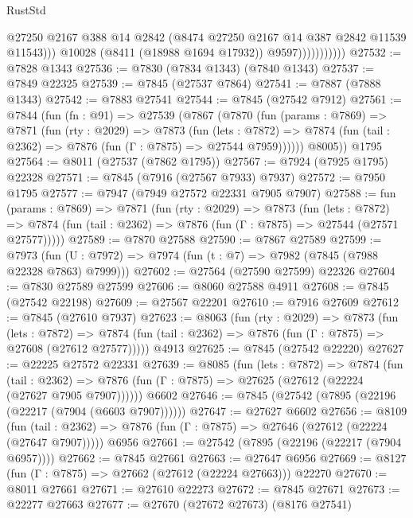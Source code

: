 \begin{lexlean}{RustStd}
\begin{coremodule}
                              @27250
                              @2167
                              @388
                              @14
                              @2842
                              (@8474 @27250 @2167 @14 @387 @2842 @11539 @11543)))
                          @10028
                          (@8411 (@18988 @1694 @17932))
                          @9597)))))))))))
@27532 := @7828 @1343
@27536 := @7830 (@7834 @1343) (@7840 @1343)
@27537 := @7849 @22325
@27539 := @7845 (@27537 @7864)
@27541 := @7887 (@7888 @1343)
@27542 := @7883 @27541
@27544 := @7845 (@27542 @7912)
@27561 := @7844
    (fun (fn : @91) =>
    @27539
      (@7867
        (@7870
          (fun (params : @7869) =>
          @7871
            (fun (rty : @2029) =>
            @7873
              (fun (lets : @7872) =>
              @7874 (fun (tail : @2362) => @7876 (fun (Γ : @7875) => @27544 @7959))))))
        @8005))
    @1795
@27564 := @8011 (@27537 (@7862 @1795))
@27567 := @7924 (@7925 @1795) @22328
@27571 := @7845 (@7916 (@27567 @7933) @7937)
@27572 := @7950 @1795
@27577 := @7947 (@7949 @27572 @22331 @7905 @7907)
@27588 := fun (params : @7869) =>
  @7871
    (fun (rty : @2029) =>
    @7873
      (fun (lets : @7872) =>
      @7874 (fun (tail : @2362) => @7876 (fun (Γ : @7875) => @27544 (@27571 @27577)))))
@27589 := @7870 @27588
@27590 := @7867 @27589
@27599 := @7973
    (fun (U : @7972) => @7974 (fun (t : @7) => @7982 (@7845 (@7988 @22328 @7863) @7999)))
@27602 := @27564 (@27590 @27599) @22326
@27604 := @7830 @27589 @27599
@27606 := @8060 @27588 @4911
@27608 := @7845 (@27542 @22198)
@27609 := @27567 @22201
@27610 := @7916 @27609
@27612 := @7845 (@27610 @7937)
@27623 := @8063
    (fun (rty : @2029) =>
    @7873
      (fun (lets : @7872) =>
      @7874 (fun (tail : @2362) => @7876 (fun (Γ : @7875) => @27608 (@27612 @27577)))))
    @4913
@27625 := @7845 (@27542 @22220)
@27627 := @22225 @27572 @22331
@27639 := @8085
    (fun (lets : @7872) =>
    @7874
      (fun (tail : @2362) =>
      @7876 (fun (Γ : @7875) => @27625 (@27612 (@22224 (@27627 @7905 @7907))))))
    @6602
@27646 := @7845 (@27542 (@7895 (@22196 (@22217 (@7904 (@6603 @7907))))))
@27647 := @27627 @6602
@27656 := @8109
    (fun (tail : @2362) => @7876 (fun (Γ : @7875) => @27646 (@27612 (@22224 (@27647 @7907)))))
    @6956
@27661 := @27542 (@7895 (@22196 (@22217 (@7904 @6957))))
@27662 := @7845 @27661
@27663 := @27647 @6956
@27669 := @8127 (fun (Γ : @7875) => @27662 (@27612 (@22224 @27663))) @22270
@27670 := @8011 @27661
@27671 := @27610 @22273
@27672 := @7845 @27671
@27673 := @22277 @27663
@27677 := @27670 (@27672 @27673) (@8176 @27541)

\end{coremodule}
\end{lexlean}
